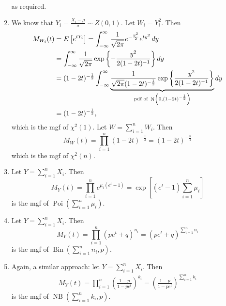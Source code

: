 \documentclass[notoc,notitlepage]{tufte-book}
\DeclareMathOperator{\Bin}{Bin }
\DeclareMathOperator{\Poi}{Poi }
\DeclareMathOperator{\NB}{NB }
\DeclareMathOperator{\Nor}{N }
\begin{document}
\begin{solution}
\begin{enumerate}
      as required.
    \item We know that $Y_i = \frac{X_i - \mu}{\sigma} \sim Z(0, 1)$. Let $W_i = Y_i^2$. Then
      \begin{align*}
        M_{W_i}(t) &= E\left[ e^{tY_i} \right] = \int_{-\infty}^{\infty} \frac{1}{\sqrt{2 \pi}} e^{-\frac{y^2}{2}} e^{ty^2} \dif{y} \\
                   &= \int_{-\infty}^{\infty} \frac{1}{\sqrt{2 \pi}} \exp\left\{-\frac{y^2}{2 ( 1 - 2t )^{-1}} \right\} \dif{y} \\
                   &= (1 - 2t)^{-\frac{1}{2}} \int_{-\infty}^{\infty} \underbrace{ \frac{1}{\sqrt{2 \pi} (1 - 2t)^{-\frac{1}{2}}} \exp \left\{ \frac{y^2}{2 ( 1 - 2t )^{-1}} \right\} }_{\text{pdf of } \Nor\left(0, (1 - 2t)^{-\frac{1}{2}}\right)} \dif{y} \\
                   &= (1 - 2t)^{-\frac{1}{2}},
      \end{align*}
      which is the mgf of $\chi^2 (1)$. Let $W = \sum_{i=1}^{n} W_i$. Then
      \begin{equation*}
        M_W(t) = \prod_{i=1}^{n} (1 - 2t)^{-\frac{1}{2}} = (1 - 2t)^{-\frac{n}{2}}
      \end{equation*}
      which is the mgf of $\chi^2 ( n )$.
    \item Let $Y = \sum_{i=1}^{n} X_i$. Then
      \begin{equation*}
        M_Y(t) = \prod_{i=1}^{n} e^{\mu_i (e^t - 1)} = \exp\left[ (e^t - 1) \sum_{i=1}^{n} \mu_i \right]
      \end{equation*}
      is the mgf of $\Poi\left( \sum_{i=1}^{n} \mu_i \right)$.
    \item Let $Y = \sum_{i=1}^{n} X_i$. Then
      \begin{equation*}
        M_Y(t) = \prod_{i=1}^{n} ( pe^t + q )^{n_i} = ( p e^t + q )^{\sum_{i=1}^{n} n_i}
      \end{equation*}
      is the mgf of $\Bin\left( \sum_{i=1}^{n} n_i, p \right)$.
    \item Again, a similar approach: let $Y = \sum_{i=1}^{n} X_i$. Then
      \begin{align*}
        M_Y(t) = \prod_{i=1}^{n} \left( \frac{1 - p}{1 - pe^t} \right)^{k_i} = \left( \frac{1 - p}{1 - pe^t} \right)^{\sum_{i=1}^{n} k_i}
      \end{align*}
      is the mgf of $\NB\left(\sum_{i=1}^{n} k_i, p\right)$.
  \end{enumerate}
\end{solution}
\end{document}

